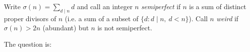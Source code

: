 Write $\sigma(n)=\sum_{d\mid n} d$ and call an integer $n$ \emph{semiperfect} if $n$ is a sum of distinct proper divisors of $n$ (i.e. a sum of a subset of $\{d: d\mid n,\ d<n\}$). Call $n$ \emph{weird} if $\sigma(n)>2n$ (abundant) but $n$ is not semiperfect.

The question is:
